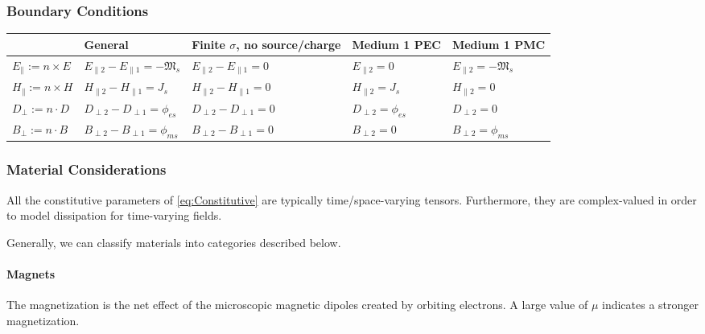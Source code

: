 \documentclass{article}
\numberwithin{equation}{section}
\begin{document}
        \subsubsection{Boundary Conditions}
            \scriptsize
            \begin{tabular}{ | m{6.5em} || m{7.9em} | m{7.5em} | m{7.7em} | m{7.9em} | }
                \hline
                    & \textbf{General} & \textbf{Finite \( \sigma \), no source/charge} &
                    \textbf{Medium 1 PEC} & \textbf{Medium 1 PMC} \\
                \hline\hline
                    \( E_{\parallel} := n \times E \) & \( E_{\parallel 2} -
                    E_{\parallel 1} = -\mathfrak{M}_s \) & \( E_{\parallel 2} -
                    E_{\parallel 1} = 0 \) & \(E_{\parallel 2} = 0 \) & \( E_{\parallel
                    2} = -\mathfrak{M}_s \) \\
                \( H_{\parallel} := n \times H \) & \( H_{\parallel 2} - H_{\parallel 1} =
                    J_s \) & \( H_{\parallel 2} - H_{\parallel 1} = 0 \) & \( H_{\parallel
                    2} = J_s \) & \( H_{\parallel 2} = 0 \) \\
                \( D_{\perp} := n \cdot D \) & \( D_{\perp 2} - D_{\perp 1} = \phi_{es}
                    \) & \( D_{\perp 2} - D_{\perp 1} = 0 \) & \( D_{\perp 2} =
                    \phi_{es} \) & \( D_{\perp 2} = 0 \) \\
                \( B_{\perp} := n \cdot B \) & \( B_{\perp 2} - B_{\perp 1} = \phi_{ms}
                    \) & \( B_{\perp 2} - B_{\perp 1} = 0 \) & \( B_{\perp 2} = 0 \) & \(
                    B_{\perp 2} = \phi_{ms} \) \\
                \hline
            \end{tabular}
            \normalsize
        \subsubsection{Material Considerations}
            All the constitutive parameters of \eqref{eq:Constitutive} are typically
            time/space-varying tensors. Furthermore, they are complex-valued in order to
            model dissipation for time-varying fields.

            Generally, we can classify materials into categories described below.
        \paragraph{Magnets}
            The magnetization is the net effect of the microscopic
            magnetic dipoles created by orbiting electrons. A large value of $\mu$
            indicates a stronger magnetization.
\end{document}
